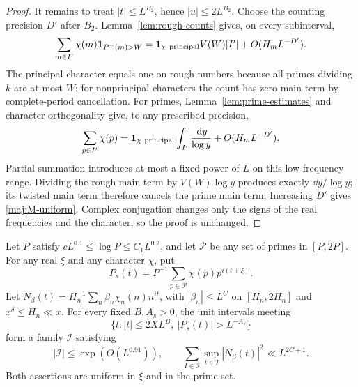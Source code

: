 \begin{proof}
It remains to treat $|t|\le L^{B_2}$, hence $|u|\le2L^{B_2}$.
Choose the counting precision $D'$ after $B_2$.
Lemma~\ref{lem:rough-counts} gives, on every subinterval,
\begin{equation}\label{maj:rough-low-count}
 \sum_{m\in I'}\chi(m)\mathbf{1}_{P^-(m)>W}
 =\mathbf{1}_{\chi\ \mathrm{principal}}V(W)|I'|
       +O(H_mL^{-D'}).
\end{equation}
The principal character equals one on rough numbers because all
primes dividing $k$ are at most $W$; for nonprincipal characters
the count has zero main term by complete-period cancellation.
For primes, Lemma~\ref{lem:prime-estimates} and character
orthogonality give, to any prescribed precision,
\[
 \sum_{p\in I'}\chi(p)
 =\mathbf{1}_{\chi\ \mathrm{principal}}\int_{I'}\frac{\,\mathrm d y}{\log y}
       +O(H_mL^{-D'}).
\]
Partial summation introduces at most a fixed power of $L$ on this
low-frequency range.  Dividing the rough main term by
$V(W)\log y$ produces exactly $\dd y/\log y$; its twisted main
term therefore cancels the prime main term.  Increasing $D'$ gives
\eqref{maj:M-uniform}.  Complex conjugation changes only the signs
of the real frequencies and the character, so the proof is unchanged.
\end{proof}

\begin{lemma}
\label{maj:sparse-frequency}
Let $P$ satisfy
$cL^{0.1}\le\log P\le C_1L^{0.2}$, and let $\mathcal P$ be any
set of primes in $[P,2P]$.  For any real $\xi$ and any character
$\chi$, put
\[
 P_s(t)=P^{-1}\sum_{p\in\mathcal P}\chi(p)p^{i(t+\xi)}.
\]
Let
$N_\beta(t)=H_n^{-1}\sum_n\beta_n\chi_n(n)n^{it}$, with
$|\beta_n|\le L^C$ on $[H_n,2H_n]$ and
$x^\delta\le H_n\ll x$.
For every fixed $B,A_s>0$, the unit intervals meeting
\[
 \{t:|t|\le 2XL^B,\ |P_s(t)|>L^{-A_s}\}
\]
form a family $\mathcal I$ satisfying
\begin{equation}\label{maj:sparse-count}
 |\mathcal I|\le\exp(O(L^{0.91})),
 \qquad
 \sum_{I\in\mathcal I}\sup_{t\in I}|N_\beta(t)|^2
       \ll L^{2C+1}.
\end{equation}
Both assertions are uniform in $\xi$ and in the prime set.
\end{lemma}

